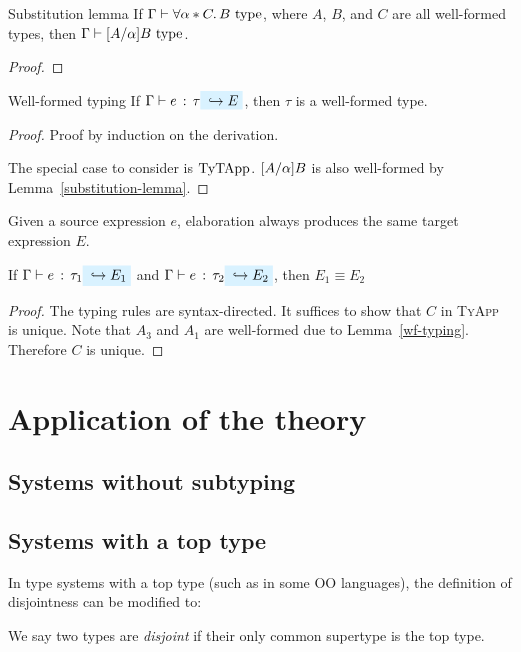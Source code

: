 \documentclass[preprint]{sigplanconf}
\begin{document}
\begin{lemma}{Substitution lemma} \label{substitution-lemma}
If $\Gamma \vdash \forall \alpha * C.\, B \ \text{type}$, where $A$, $B$, and $C$ are all well-formed types, then $\Gamma \vdash \lbrack A / \alpha \rbrack B \ \text{type}$.
\end{lemma}

\begin{proof}
\end{proof}

\begin{lemma}{Well-formed typing} \label{wf-typing}
If $\hastype \Gamma e \tau \yields E$, then $\tau$ is a well-formed type.
\end{lemma}

\begin{proof}
Proof by induction on the derivation.

The special case to consider is $\text{Ty}\text{TApp}$. $\lbrack A / \alpha \rbrack B$ is also well-formed by Lemma~\ref{substitution-lemma}.
\end{proof}

Given a source expression $e$, elaboration always produces the same target expression $E$.

\begin{theorem} \label{unique-elaboration}
If $\hastype \Gamma e {\tau_1} \yields {E_1}$ and $\hastype \Gamma e {\tau_2} \yields {E_2}$, then $E_1 \equiv E_2$
\end{theorem}

\begin{proof}
The typing rules are syntax-directed. It suffices to show that $C$ in \textsc{TyApp} is unique. Note that $A_3$ and $A_1$ are well-formed due to Lemma~\ref{wf-typing}. Therefore $C$ is unique.
\end{proof}

\section{Application of the theory}

\subsection{Systems without subtyping}

\subsection{Systems with a top type}

In type systems with a top type (such as \lstinline@Object@ in some OO languages), the definition of disjointness can be modified to:

We say two types are \emph{disjoint} if their only common supertype is the top type.
\end{document}
